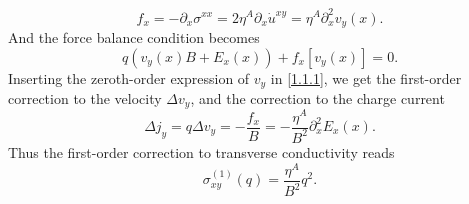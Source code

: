 \documentclass[10pt,nofootinbib,letterpaper]{revtex4}
\begin{document}
	\begin{equation*}
		f_x=-\partial_x\sigma^{xx}=2\eta^A \partial_x\dot{u}^{xy}=\eta^A \partial_x^2v_y(x).
	\end{equation*}
	And the force balance condition becomes
	\begin{equation}\label{1.1.2}
		q(v_y(x)B+E_x(x))+f_x[v_y(x)]=0.
	\end{equation}
	Inserting the zeroth-order expression of $v_y$ in \eqref{1.1.1}, we get the first-order correction to the velocity $\Delta v_y$, and the correction to the charge current
	\begin{equation*}
		\Delta j_y=q\Delta v_y=-\dfrac{f_x}{B}=-\dfrac{\eta^A}{B^2}\partial_x^2 E_x(x).
	\end{equation*}
	Thus the first-order correction to transverse conductivity reads
	\begin{equation}\label{1.1.3}
		\sigma_{xy}^{(1)}(q)=\dfrac{\eta^A}{B^2}q^2.
	\end{equation}
\end{document}
